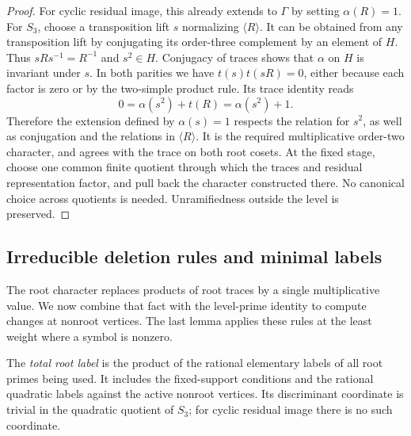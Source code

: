 \begin{proof}
For cyclic residual image, this already extends to $\Gamma$ by
setting $\alpha(R)=1$.  For $S_3$, choose a transposition lift
$s$ normalizing $\langle R\rangle$.  It can be obtained from any
transposition lift by conjugating its order-three complement by
an element of $H$.  Thus $sRs^{-1}=R^{-1}$ and $s^2\in H$.
Conjugacy of traces shows that $\alpha$ on $H$ is invariant
under $s$.  In both parities we have $t(s)t(sR)=0$, either because
each factor is zero or by the two-simple product rule.  Its trace
identity reads
\[
                       0=\alpha(s^2)+t(R)=\alpha(s^2)+1.
\]
Therefore the extension defined by $\alpha(s)=1$ respects the
relation for $s^2$, as well as conjugation and the relations in
$\langle R\rangle$.  It is the required multiplicative
order-two character, and agrees with the trace on both root
cosets.  At the fixed stage, choose one common finite quotient
through which the traces and residual representation factor, and
pull back the character constructed there.  No canonical choice
across quotients is needed.  Unramifiedness outside the level is preserved.
\end{proof}

\subsection{Irreducible deletion rules and minimal labels}

The root character replaces products of root traces by a single
multiplicative value. We now combine that fact with the level-prime
identity to compute changes at nonroot vertices. The last lemma applies
these rules at the least weight where a symbol is nonzero.

The \emph{total root label} is the product of the rational elementary
labels of all root primes being used.  It includes the fixed-support
conditions and the rational quadratic labels against the active
nonroot vertices.  Its discriminant coordinate is trivial in the
quadratic quotient of $S_3$; for cyclic residual image there is no
such coordinate.

